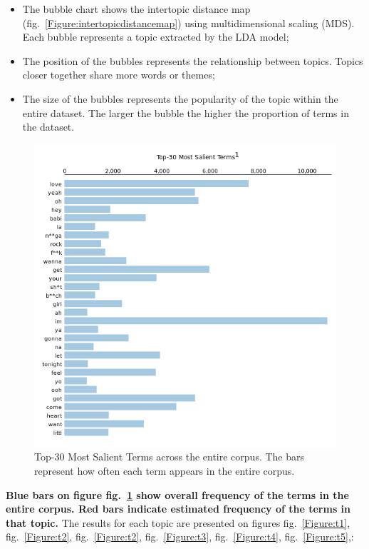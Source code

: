 \begin{itemize}
  \item The bubble chart shows the intertopic distance map
    (fig.~\ref{Figure:intertopicdistancemap}) using multidimensional scaling
    (MDS). Each bubble represents a topic extracted by the LDA model;
  \item The position of the bubbles represents the relationship between topics.
    Topics closer together share more words or themes;
  \item The size of the bubbles represents the popularity of the topic within
    the entire dataset. The larger the bubble the higher the proportion of
    terms in the dataset.
\end{itemize}



\begin{center}
\begin{figure}[H]
  \centering
  \includegraphics[width=6in]{img/topics/png/general.png}
  \caption{Top-30 Most Salient Terms across the entire corpus. The bars
  represent how often each term appears in the entire corpus.}
  \label{Figure:lda_general}
\end{figure}
\end{center}

\textbf{Blue bars on figure fig.~\ref{Figure:lda_general} show overall
frequency of the terms in the entire corpus. Red bars indicate estimated
frequency of the terms in that topic.} The results for each topic are presented
on figures fig.~\ref{Figure:t1}, fig.~\ref{Figure:t2}, fig.~\ref{Figure:t2},
fig.~\ref{Figure:t3}, fig.~\ref{Figure:t4}, fig.~\ref{Figure:t5},:

